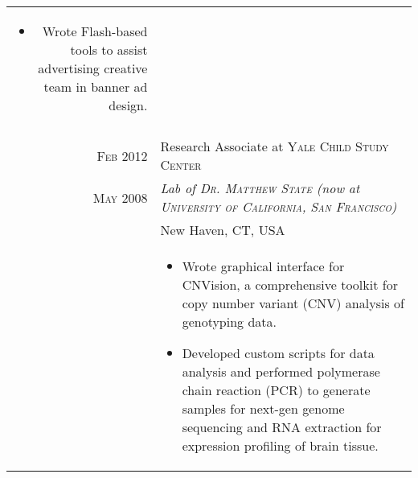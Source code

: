 \documentclass[a4paper,10pt]{article}
\begin{document}
\begin{longtable}{r|p{11cm}}
{\begin{itemize}
{			Developed a web application to automate quote generation for
			locally targeted, real time bid (RTB) advertising.
		}
		\item[]{
			Wrote Flash-based tools to assist advertising creative team
			in banner ad design.
		}
	\end{itemize}
   }\\
 \multicolumn{2}{c}{} \\
 \nopagebreak \textsc{Feb 2012} & Research Associate at \textsc{Yale Child Study Center} \\
 \nopagebreak \textsc{May 2008} & \small\emph{Lab of \textsc{Dr. Matthew State} (now at \textsc{University of California, San Francisco})} \\
 \nopagebreak & \small{New Haven, CT, USA} \\
 \nopagebreak & \footnotesize{
	\begin{itemize}
		\item[]{
			Wrote graphical interface for CNVision, a comprehensive toolkit for copy number
variant (CNV) analysis of genotyping data.
		}
		\item[]{
			Developed custom scripts for data analysis and performed polymerase chain
			reaction (PCR) to generate samples for next-gen genome sequencing and RNA
			extraction for expression profiling of brain tissue.
		}
	\end{itemize}
   }\\
\end{longtable}

\end{document}
